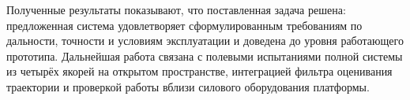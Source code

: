 Полученные результаты показывают, что поставленная задача решена: предложенная
система удовлетворяет сформулированным требованиям по дальности, точности и
условиям эксплуатации и доведена до уровня работающего прототипа. Дальнейшая работа
связана с полевыми испытаниями полной системы из четырёх якорей на открытом
пространстве, интеграцией фильтра оценивания траектории и проверкой работы вблизи
силового оборудования платформы.
